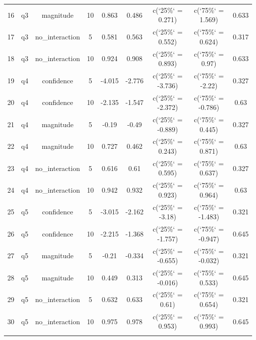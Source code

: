 \begin{table}[!htbp]
\begin{tabular}{@{\extracolsep{5pt}} ccccccccc}
16 & q3 & magnitude & 10 & 0.863 & 0.486 & c(`25\%` = 0.271) & c(`75\%` = 1.569) & 0.633 \\ 
17 & q3 & no\_interaction & 5 & 0.581 & 0.563 & c(`25\%` = 0.552) & c(`75\%` = 0.624) & 0.317 \\ 
18 & q3 & no\_interaction & 10 & 0.924 & 0.908 & c(`25\%` = 0.893) & c(`75\%` = 0.97) & 0.633 \\ 
19 & q4 & confidence & 5 & -4.015 & -2.776 & c(`25\%` = -3.736) & c(`75\%` = -2.22) & 0.327 \\ 
20 & q4 & confidence & 10 & -2.135 & -1.547 & c(`25\%` = -2.372) & c(`75\%` = -0.786) & 0.63 \\ 
21 & q4 & magnitude & 5 & -0.19 & -0.49 & c(`25\%` = -0.889) & c(`75\%` = 0.445) & 0.327 \\ 
22 & q4 & magnitude & 10 & 0.727 & 0.462 & c(`25\%` = 0.243) & c(`75\%` = 0.871) & 0.63 \\ 
23 & q4 & no\_interaction & 5 & 0.616 & 0.61 & c(`25\%` = 0.595) & c(`75\%` = 0.637) & 0.327 \\ 
24 & q4 & no\_interaction & 10 & 0.942 & 0.932 & c(`25\%` = 0.923) & c(`75\%` = 0.964) & 0.63 \\ 
25 & q5 & confidence & 5 & -3.015 & -2.162 & c(`25\%` = -3.18) & c(`75\%` = -1.483) & 0.321 \\ 
26 & q5 & confidence & 10 & -2.215 & -1.368 & c(`25\%` = -1.757) & c(`75\%` = -0.947) & 0.645 \\ 
27 & q5 & magnitude & 5 & -0.21 & -0.334 & c(`25\%` = -0.655) & c(`75\%` = -0.032) & 0.321 \\ 
28 & q5 & magnitude & 10 & 0.449 & 0.313 & c(`25\%` = -0.016) & c(`75\%` = 0.533) & 0.645 \\ 
29 & q5 & no\_interaction & 5 & 0.632 & 0.633 & c(`25\%` = 0.61) & c(`75\%` = 0.654) & 0.321 \\ 
30 & q5 & no\_interaction & 10 & 0.975 & 0.978 & c(`25\%` = 0.953) & c(`75\%` = 0.993) & 0.645 \\ 
\hline \\[-1.8ex] 
\end{tabular} 
\end{table} 
